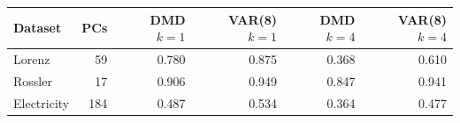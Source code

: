 \begin{tabular}{lrrrrr}
\toprule
Dataset & PCs & DMD $k=1$ & VAR(8) $k=1$ & DMD $k=4$ & VAR(8) $k=4$ \\
\midrule
Lorenz & 59 & 0.780 & 0.875 & 0.368 & 0.610 \\
Rossler & 17 & 0.906 & 0.949 & 0.847 & 0.941 \\
Electricity & 184 & 0.487 & 0.534 & 0.364 & 0.477 \\
\bottomrule
\end{tabular}
